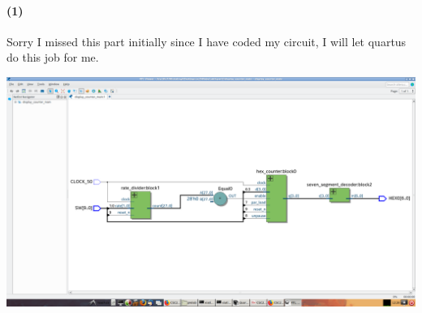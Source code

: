 \documentclass{article}
\begin{document}
\paragraph{(1)} Sorry I missed this part initially since I have coded my circuit, I will let quartus do this job for me. 
\begin{center}
    \includegraphics[scale=0.25]{part2_q1.png}
\end{center}
\end{document}
